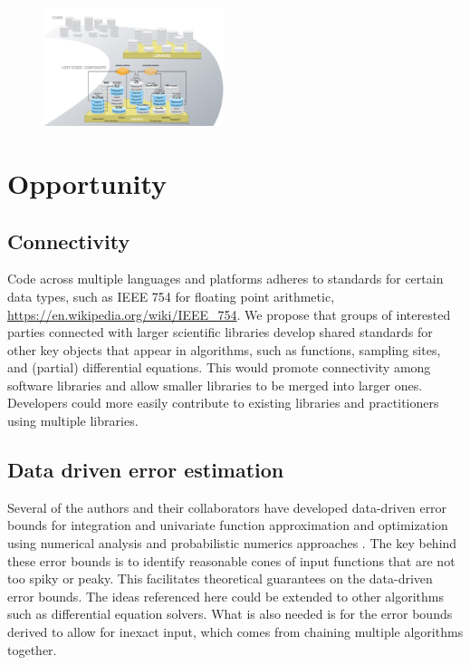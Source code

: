 \documentclass{amsart}
\begin{document}
\begin{figure}
    \includegraphics[width = 0.47\textwidth]{IDEAS-Watersheds-software-ecosystem-road.jpg}
\end{figure}
   







\section{Opportunity} %
\subsection{Connectivity} 
Code across multiple languages and platforms adheres to standards for certain data types, such as IEEE 754 for floating point arithmetic, \url{https://en.wikipedia.org/wiki/IEEE_754}.  We propose that groups of interested parties connected with larger scientific libraries develop shared standards for other key objects that appear in algorithms, such as functions, sampling sites, and (partial) differential equations. This would promote connectivity among software libraries and allow smaller libraries to be merged into larger ones.  Developers could more easily contribute to existing libraries and practitioners using multiple libraries.

\subsection{Data driven error estimation} 
Several of the authors and their collaborators have developed data-driven error bounds for integration and univariate function approximation and optimization using numerical analysis and probabilistic numerics approaches \cite{ChoEtal17a, HicEtal14b, HicEtal14a, HicJim16a, RatHic19a,JimHic16a}.  The key behind these error bounds is to identify reasonable cones of input functions that are not too spiky or peaky.  This facilitates theoretical guarantees on the data-driven error bounds.  The ideas referenced here could be extended to other algorithms such as differential equation solvers.  What is also needed is for the error bounds derived to allow for inexact input, which comes from chaining multiple algorithms together.
\end{document}

